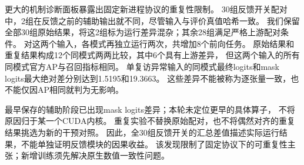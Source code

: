 更大的机制诊断面板暴露出固定新进程协议的重复性限制。
30组反馈开关配对中，2组在反馈之前的辅助输出就不同，尽管输入与评价真值哈希一致。
我们保留全部30组原始结果，将这2组标为运行差异混杂；其余28组满足严格上游配对条件。
对这两个输入，各模式再独立运行两次，共增加8个前向任务。
原始结果和重复结果构成12个同模式两两比较，其中6个具有上游差异，
但这两个输入的所有同模式官方AP与召回指标相同。
单复访异常输入的同模式最终logits和mask logits最大绝对差分别达到1.5195和19.3663。
这些差异不能被称为逐张量一致，也不能仅因AP相同就判为无影响。

最早保存的辅助阶段已出现mask logits差异；本轮未定位更早的具体算子，
不将原因归于某一个CUDA内核。
重复实验不替换原始配对，也不将偶然对齐的重复结果挑选为新的干预对照。
因此，全30组反馈开关的汇总差值描述实际运行结果，不能单独证明反馈模块的因果收益。
该发现限制了固定协议下的可重复性主张；新增训练须先解决原生数值一致性问题。
